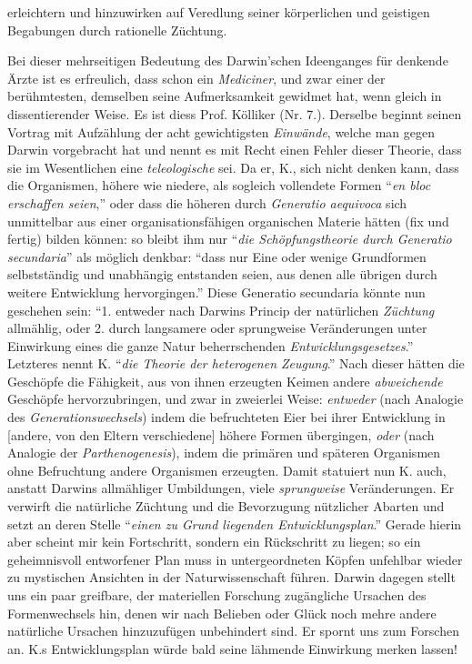 \documentclass[a4paper, 11pt, oneside, english]{article}
\begin{document}
erleichtern und hinzuwirken auf Veredlung seiner körperlichen und geistigen Begabungen durch rationelle Züchtung.

Bei dieser mehrseitigen Bedeutung des Darwin'schen Ideenganges für denkende Ärzte ist es erfreulich, dass schon ein \emph{Mediciner}, und zwar einer der berühmtesten, demselben seine Aufmerksamkeit gewidmet hat, wenn gleich in dissentierender Weise. Es ist diess Prof. Kölliker (Nr. 7.). Derselbe beginnt seinen Vortrag mit Aufzählung der acht gewichtigsten \emph{Einwände}, welche man gegen Darwin vorgebracht hat und nennt es mit Recht einen Fehler dieser Theorie, dass sie im Wesentlichen eine \emph{teleologische} sei. Da er, K., sich nicht denken kann, dass die Organismen, höhere wie niedere, als sogleich vollendete Formen "`\emph{en bloc erschaffen seien},"' oder dass die höheren durch \emph{Generatio aequivoca} sich unmittelbar aus einer organisationsfähigen organischen Materie hätten (fix und fertig) bilden können: so bleibt ihm nur "`\emph{die Schöpfungstheorie durch Generatio secundaria}"' als möglich denkbar: "`dass nur Eine oder wenige Grundformen selbstständig und unabhängig entstanden seien, aus denen alle übrigen durch weitere Entwicklung hervorgingen."' Diese Generatio secundaria könnte nun geschehen sein: "`1. entweder nach Darwins Princip der natürlichen \emph{Züchtung} allmählig, oder 2. durch langsamere oder sprungweise Veränderungen unter Einwirkung eines die ganze Natur beherrschenden \emph{Entwicklungsgesetzes}."' Letzteres nennt K. "`\emph{die Theorie der heterogenen Zeugung}."' Nach dieser hätten die Geschöpfe die Fähigkeit, aus von ihnen erzeugten Keimen andere \emph{abweichende} Geschöpfe hervorzubringen, und zwar in zweierlei Weise: \emph{entweder} (nach Analogie des \emph{Generationswechsels}) indem die befruchteten Eier bei ihrer Entwicklung in [andere, von den Eltern verschiedene] höhere Formen übergingen, \emph{oder} (nach Analogie der \emph{Parthenogenesis}), indem die primären und späteren Organismen ohne Befruchtung andere Organismen erzeugten. Damit statuiert nun K. auch, anstatt Darwins allmähliger Umbildungen, viele \emph{sprungweise} Veränderungen. Er verwirft die natürliche Züchtung und die Bevorzugung nützlicher Abarten und setzt an deren Stelle "`\emph{einen zu Grund liegenden Entwicklungsplan}."' Gerade hierin aber scheint mir kein Fortschritt, sondern ein Rückschritt zu liegen; so ein geheimnisvoll entworfener Plan muss in untergeordneten Köpfen unfehlbar wieder zu mystischen Ansichten in der Naturwissenschaft führen. Darwin dagegen stellt uns ein paar greifbare, der materiellen Forschung zugängliche Ursachen des Formenwechsels hin, denen wir nach Belieben oder Glück noch mehre andere natürliche Ursachen hinzuzufügen unbehindert sind. Er spornt uns zum Forschen an. K.s Entwicklungsplan würde bald seine lähmende Einwirkung merken lassen!
\end{document}
